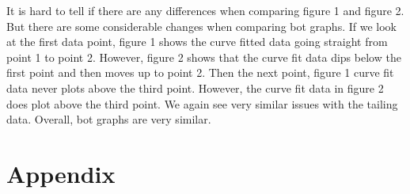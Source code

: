 \documentclass[12pt]{article}
\begin{document}
It is hard to tell if there are any differences when comparing figure 1 and figure 2. But there are some considerable changes when comparing bot graphs. If we look at the first data point, figure 1 shows the curve fitted data going straight from point 1 to point 2. However, figure 2 shows that the curve fit data dips below the first point and then moves up to point 2. Then the next point, figure 1 curve fit data never plots above the third point. However, the curve fit data in figure 2 does plot above the third point. We again see very similar issues with the tailing data. Overall, bot graphs are very similar.

\newpage

\section*{Appendix}
\end{document}
